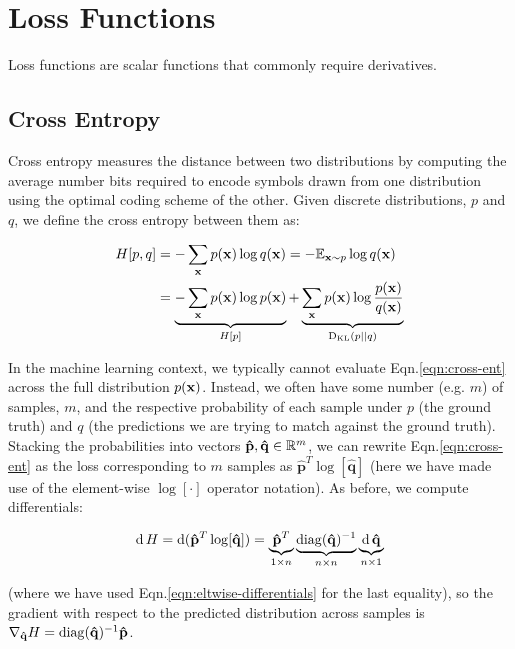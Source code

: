 \chapter{Loss Functions} \label{chap:loss-functions}

Loss functions are scalar functions that commonly require derivatives. 

\section{Cross Entropy}

Cross entropy measures the distance between two distributions by computing the average number bits required to encode symbols drawn from one distribution using the optimal coding scheme of the other. Given discrete distributions, $p$ and $q$, we define the cross entropy between them as:

\begin{align}
  H[p,q] &= -\sum_{\mathbf{x}} p(\mathbf{x}) \log q(\mathbf{x}) = -\mathbb{E}_{\mathbf{x} \sim p} \log q(\mathbf{x}) \label{eqn:cross-ent}\\
         &= \underbrace{-\sum_{\mathbf{x}} p(\mathbf{x}) \log p(\mathbf{x})}_{H[p]} + \underbrace{\sum_{\mathbf{x}} p(\mathbf{x}) \log\frac{p(\mathbf{x})}{q(\mathbf{x})}}_{\text{D}_\text{KL}(p || q)}
\end{align}

In the machine learning context, we typically cannot evaluate Eqn.\ref{eqn:cross-ent} across the full distribution $p(\mathbf{x})$.  Instead, we often have some number (e.g. $m$) of samples, $m$, and the respective probability of each sample under $p$ (the ground truth) and $q$ (the predictions we are trying to match against the ground truth). Stacking the probabilities into vectors $\mathbf{\hat{p}}, \mathbf{\hat{q}} \in \mathbb{R}^m$, we can rewrite Eqn.\ref{eqn:cross-ent} as the loss corresponding to $m$ samples as $\mathbf{\hat{p}}^T \log [\mathbf{\hat{q}}]$ (here we have made use of the element-wise $\log[\cdot]$ operator notation).  As before, we compute differentials:

\begin{align*}
\operatorname{\text{d}} H = \operatorname{\text{d}} (\mathbf{\hat{p}}^T \log [\mathbf{\hat{q}}]) = \underbrace{\mathbf{\hat{p}}^T}_{1\times n} \underbrace{\operatorname{diag}(\mathbf{\hat{q}})^{-1}}_{n \times n} \underbrace{\operatorname{\text{d}} \mathbf{\hat{q}}}_{n \times 1}
\end{align*}

(where we have used Eqn.\ref{eqn:eltwise-differentials} for the last equality), so the gradient with respect to the predicted distribution across samples is $\nabla_{\mathbf{\hat{q}}} H = \operatorname{diag}(\mathbf{\hat{q}})^{-1} \mathbf{\hat{p}}$.

